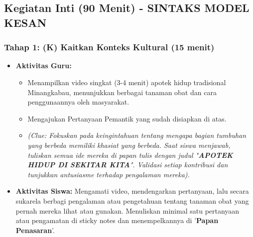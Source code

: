 \documentclass[a4paper,12pt]{article}
\begin{document}
\subsection{Kegiatan Inti (90 Menit) - SINTAKS MODEL KESAN}

\subsubsection{Tahap 1: (K) Kaitkan Konteks Kultural (15 menit)}
\begin{itemize}
\item \textbf{Aktivitas Guru:}
    \begin{itemize}
    \item Menampilkan video singkat (3-4 menit) apotek hidup tradisional Minangkabau, menunjukkan berbagai tanaman obat dan cara penggunaannya oleh masyarakat.
    \item Mengajukan Pertanyaan Pemantik yang sudah disiapkan di atas.
    \item \textit{(Clue: Fokuskan pada keingintahuan tentang mengapa bagian tumbuhan yang berbeda memiliki khasiat yang berbeda. Saat siswa menjawab, tuliskan semua ide mereka di papan tulis dengan judul "\textbf{APOTEK HIDUP DI SEKITAR KITA}". Validasi setiap kontribusi dan tunjukkan antusiasme terhadap pengalaman mereka).}
    \end{itemize}
\item \textbf{Aktivitas Siswa:} Mengamati video, mendengarkan pertanyaan, lalu secara sukarela berbagi pengalaman atau pengetahuan tentang tanaman obat yang pernah mereka lihat atau gunakan. Menuliskan minimal satu pertanyaan atau pengamatan di sticky notes dan menempelkannya di '\textbf{Papan Penasaran}'.
\end{itemize}
\end{document}
